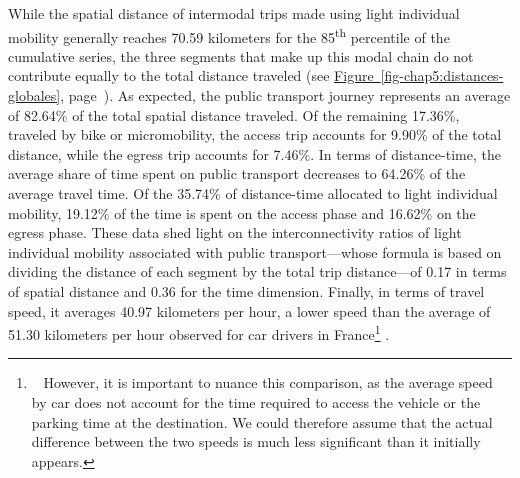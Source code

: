 \begin{refsegment}
While the spatial distance of intermodal trips made using light individual mobility generally reaches 70.59 kilometers for the 85\textsuperscript{th} percentile of the cumulative series, the three segments that make up this modal chain do not contribute equally to the total distance traveled (see \hyperref[fig-chap5:distances-globales]{Figure~\ref{fig-chap5:distances-globales}}, page~\pageref{fig-chap5:distances-globales}). As expected, the public transport journey represents an average of 82.64\% of the total spatial distance traveled. Of the remaining 17.36\%, traveled by bike or micromobility, the access trip accounts for 9.90\% of the total distance, while the egress trip accounts for 7.46\%. In terms of distance-time, the average share of time spent on public transport decreases to 64.26\% of the average travel time. Of the 35.74\% of distance-time allocated to light individual mobility, 19.12\% of the time is spent on the access phase and 16.62\% on the egress phase. These data shed light on the interconnectivity ratios of light individual mobility associated with public transport—whose formula is based on dividing the distance of each segment by the total trip distance—of 0.17 in terms of spatial distance and 0.36 for the time dimension. Finally, in terms of travel speed, it averages 40.97 kilometers per hour, a lower speed than the average of 51.30 kilometers per hour observed for car drivers in France\footnote{~
    However, it is important to nuance this comparison, as the average speed by car does not account for the time required to access the vehicle or the parking time at the destination. We could therefore assume that the actual difference between the two speeds is much less significant than it initially appears.
} \textcolor{blue}{\autocite{onisr_observatoire_2022}}.%


\end{refsegment}
